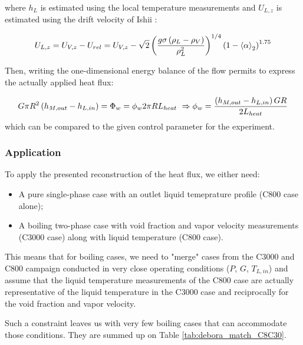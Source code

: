 where $h_{L}$ is estimated using the local temperature measurements and $U_{L,z}$ is estimated using the drift velocity of Ishii \cite{ishii_one-dimensional_1977}:

\begin{equation}
U_{L,z} = U_{V,z} - U_{rel} = U_{V,z} - \sqrt{2} \left( \frac{g \sigma \left( \rho_{L}-\rho_{V} \right)}{\rho_{L}^{2}} \right)^{1/4} \left( 1-\left< \alpha \right>_{2} \right)^{1.75}
\end{equation}



\npar

Then, writing the one-dimensional energy balance of the flow permits to express the actually applied heat flux: 

\begin{equation}
G \pi R^{2} \left( h_{M,out} - h_{L,in} \right) = \Phi_{w} = \phi_{w} 2\pi R L_{heat} \ \Rightarrow \phi_{w} = \frac{\left( h_{M,out}-h_{L,in} \right)GR}{2L_{heat}}
\end{equation}
which can be compared to the given control parameter for the experiment.

\subsubsection{Application}

To apply the presented reconstruction of the heat flux, we either need: 

\begin{itemize}
\item A pure single-phase case with an outlet liquid temeprature profile (C800 case alone);
\item A boiling two-phase case with void fraction and vapor velocity measurements (C3000 case) along with liquid temperature (C800 case).
\end{itemize}

This means that for boiling cases, we need to "merge" cases from the C3000 and C800 campaign conducted in very close operating conditions ($P$, $G$, $T_{L,in}$) and assume that the liquid temperature measurements of the C800 case are actually representative of the liquid temperature in the C3000 case and reciprocally for the void fraction and vapor velocity.

\npar

Such a constraint leaves us with very few boiling cases that can accommodate those conditions. They are summed up on Table \ref{tab:debora_match_C8C30}.


